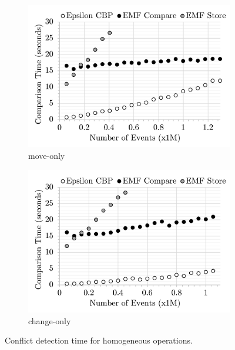 \begin{figure}[ht]
\begin{subfigure}[t]{0.245\linewidth}
        \includegraphics[width=\linewidth]{move-conflict-time-events}
        \caption{move-only}
        \label{fig:move-conflict-time-events}
    \end{subfigure}
    \hfill
    \begin{subfigure}[t]{0.245\linewidth}
        \includegraphics[width=\linewidth]{change-conflict-time-events}
        \caption{change-only}
        \label{fig:change-conflict-time-events}
    \end{subfigure}
    \caption{Conflict detection time for homogeneous operations.}
    \label{fig:homgeneous_operation_time_events}
\end{figure}

